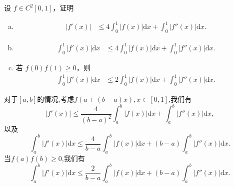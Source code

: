 \documentclass[../../main.tex]{subfiles}
\begin{document}
\begin{example}
设 \( f \in C^2[0,1] \)，证明
\begin{enumerate}[(a)]
\item 
\begin{align}
|f'(x)| &\leqslant 4\int_0^1 |f(x)| \mathrm{d}x + \int_0^1 |f''(x)| \mathrm{d}x. \label{eq::::::::::::::7151--------------5}
\end{align}

\item 
\begin{align}
\int_0^1 |f'(x)| \mathrm{d}x &\leqslant 4\int_0^1 |f(x)| \mathrm{d}x + \int_0^1 |f''(x)| \mathrm{d}x .\label{eq::::::::::::::7151--------------6}
\end{align}

\item  若 \( f(0)f(1) \geqslant 0 \)，则
\begin{align}
\int_0^1 |f'(x)| \mathrm{d}x &\leqslant 2\int_0^1 |f(x)| \mathrm{d}x + \int_0^1 |f''(x)| \mathrm{d}x. \label{eq::::::::::::::7151--------------7}
\end{align}
\end{enumerate}
\end{example}
\begin{note}
对于$[a,b]$的情况,考虑$f(a+(b-a)x),x\in[0,1]$,我们有
\[
|f'(x)|\leqslant \frac{4}{(b-a)^2}\int_a^b|f(x)|\mathrm{d}x+\int_a^b|f''(x)|\mathrm{d}x,
\]
以及
\[
\int_a^b|f'(x)|\mathrm{d}x\leqslant \frac{4}{b-a}\int_a^b|f(x)|\mathrm{d}x+(b-a)\int_a^b|f''(x)|\mathrm{d}x.
\]
当$f(a)f(b)\geqslant 0$,我们有
\[
\int_a^b|f'(x)|\mathrm{d}x\leqslant \frac{2}{b-a}\int_a^b|f(x)|\mathrm{d}x+(b-a)\int_a^b|f''(x)|\mathrm{d}x.
\]
\end{note}
\end{document}
